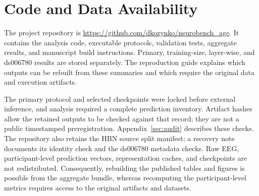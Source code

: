 \section{Code and Data Availability}

The project repository is \url{https://github.com/dkozynko/neurobench_age}.
It contains the analysis code, executable protocols, validation tests, aggregate
results, and manuscript build instructions. Primary, training-size, layer-wise,
and ds006780 results are stored separately. The reproduction guide explains
which outputs can be rebuilt from these summaries and which require the
original data and execution artifacts.

The primary protocol and selected checkpoints were locked before external
inference, and analysis required a complete prediction inventory. Artifact
hashes allow the retained outputs to be checked against that record; they are
not a public timestamped preregistration. Appendix~\ref{sec:audit} describes
these checks. The repository also retains the HBN source split manifest;
a recovery note documents its identity check and the ds006780 metadata checks.
Raw EEG, participant-level prediction vectors, representation caches, and
checkpoints are not redistributed. Consequently, rebuilding the
published tables and figures is possible from the aggregate bundle, whereas
recomputing the participant-level metrics requires access to the original
artifacts and datasets.
